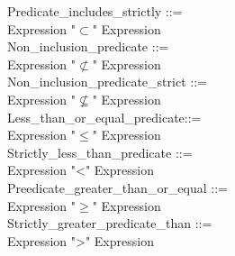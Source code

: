 \documentclass[12pt,a4paper,draft]{article}
\begin{document}
{\begin{sloppypar}
Predicate\_includes\_strictly  ::= \\
\hspace*{0.20in} Expression  "$\subset$"  Expression\\
Non\_inclusion\_predicate ::= \\
\hspace*{0.20in} Expression  "$\nsubset$"  Expression\\
Non\_inclusion\_predicate\_strict ::= \\
\hspace*{0.20in} Expression  "$\nsubseteq$"  Expression   \\
Less\_than\_or\_equal\_predicate::= \\
\hspace*{0.20in} Expression  "$\leq$"  Expression\\
Strictly\_less\_than\_predicate ::= \\
\hspace*{0.20in} Expression  "<"  Expression\\
Preedicate\_greater\_than\_or\_equal ::= \\
\hspace*{0.20in} Expression  "$\geq$"  Expression\\
Strictly\_greater\_predicate\_than ::= \\
\hspace*{0.20in} Expression  ">"  Expression\\

\end{sloppypar} 
}
\end{document}
